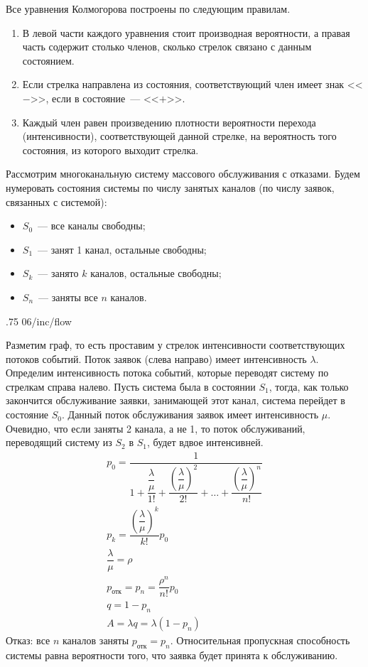 Все уравнения Колмогорова построены по следующим правилам.

\begin{enumerate}
    \item В левой части каждого уравнения стоит производная вероятности, а правая часть содержит столько членов, сколько стрелок связано с данным состоянием.
    \item Если стрелка направлена из состояния, соответствующий член имеет знак <<$-$>>, если в состояние~--- <<$+$>>.
    \item Каждый член равен произведению плотности вероятности перехода (интенсивности), соответствующей данной стрелке, на вероятность того состояния, из которого выходит стрелка.
\end{enumerate}

Рассмотрим многоканальную систему массового обслуживания с отказами. Будем нумеровать состояния системы по числу занятых каналов (по числу заявок, связанных с системой):

\begin{itemize}
    \item $S_0$~--- все каналы свободны;
    \item $S_1$~--- занят 1 канал, остальные свободны;
    \item $S_k$~--- занято $k$ каналов, остальные свободны;
    \item $S_n$~--- заняты все $n$ каналов.
\end{itemize}

\image
{.75\textwidth}
{06/inc/flow}
{}

Разметим граф, то есть проставим у стрелок интенсивности соответствующих потоков событий. Поток заявок (слева направо) имеет интенсивность $\lambda$. Определим интенсивность потока событий, которые переводят систему по стрелкам справа налево. Пусть система была в состоянии $S_1$, тогда, как только закончится обслуживание заявки, занимающей этот канал, система перейдет в состояние $S_0$. Данный поток обслуживания заявок имеет интенсивность $\mu$. Очевидно, что если заняты 2 канала, а не 1, то поток обслуживаний, переводящий систему из $S_2$ в $S_1$, будет вдвое интенсивней.
%
\begin{gather*}
    p_0 = \dfrac{1}{1 + \dfrac{\dfrac{\lambda}{\mu}}{1!} + \dfrac{\left(\dfrac{\lambda}{\mu}\right)^2}{2!} + \dots + \dfrac{\left(\dfrac{\lambda}{\mu}\right)^n}{n!}}\\
    p_k = \dfrac{\left(\dfrac{\lambda}{\mu}\right)^k}{k!}p_0\\
    \dfrac{\lambda}{\mu} = \rho\\
    p_{\text{отк}} = p_n = \dfrac{\rho^n}{n!}p_0\\
    q = 1 - p_n\\
    A = \lambda q = \lambda(1 - p_n)
\end{gather*}
%
Отказ: все $n$ каналов заняты ${p_{\text{отк}} = p_n}$. Относительная пропускная способность системы равна вероятности того, что заявка будет принята к обслуживанию.

